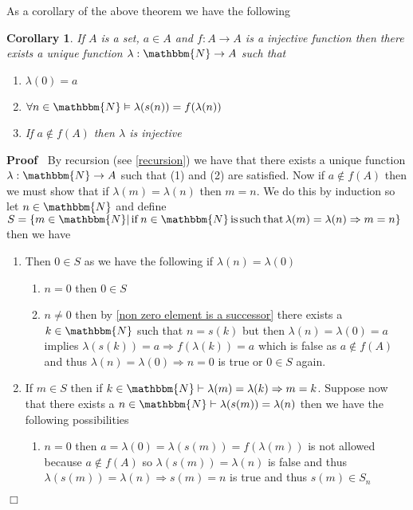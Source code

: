 \documentclass{book}
\newcommand{\nin}{\not\in}
\newcommand{\nobracket}{}
\newcommand{\tmop}[1]{\ensuremath{\operatorname{#1}}}
\newenvironment{proof}{\noindent\textbf{Proof\ }}{\hspace*{\fill}$\Box$\medskip}
\newtheorem{corollary}{Corollary}
\begin{document}
{{As a corollary of the above theorem we have the following

\begin{corollary}
  \label{recursive injective function}If $A$ is a set, $a \in A$ and $f : A
  \rightarrow A$ is a injective function then there exists a unique function
  $\lambda : \mathbbm{N} \rightarrow A$ such that
  \begin{enumerate}
    \item $\lambda (0) = a$
    
    \item $\forall n \in \mathbbm{N} \vDash \lambda (s (n)) = f (\lambda (n))$
    
    \item If $a \nin f (A)$ then $\lambda$ is injective
  \end{enumerate}
\end{corollary}

\begin{proof}
  By recursion (see \ref{recursion}) we have that there exists a unique
  function $\lambda : \mathbbm{N} \rightarrow A$ such that (1) and (2) are
  satisfied. Now if $a \nin f (A)$ then we must show that if $\lambda (m) =
  \lambda (n)$ then $m = n$. We do this by induction so let $n \in
  \mathbbm{N}$ and define $S = \{ m \in \mathbbm{N} | \tmop{if} n \in
  \mathbbm{N} \tmop{is} \tmop{such} \tmop{that} \lambda (m) = \lambda (n)
  \Rightarrow m = n \nobracket \}$ then we have
  \begin{enumerate}
    \item Then $0 \in S$ as we have the following if $\lambda (n) = \lambda
    (0)$
    \begin{enumerate}
      \item $n = 0$ then $0 \in S$
      
      \item $n \neq 0$ then by \ref{non zero element is a successor} there
      exists a $k \in \mathbbm{N}$ such that $n = s (k)$ but then $\lambda (n)
      = \lambda (0) = a$ implies $\lambda (s (k)) = a \Rightarrow f (\lambda
      (k)) = a$ which is false as $a \nin f (A)$ and thus $\lambda (n) =
      \lambda (0) \Rightarrow n = 0$ is true or $0 \in S$ again.
    \end{enumerate}
    \item If $m \in S$ then if $k \in \mathbbm{N} \vdash \lambda (m) = \lambda
    (k) \Rightarrow m = k$. Suppose now that there exists a $n \in \mathbbm{N}
    \vdash \lambda (s (m)) = \lambda (n)$ then we have the following
    possibilities
    \begin{enumerate}
      \item $n = 0$ then $a = \lambda (0) = \lambda (s (m)) = f (\lambda (m))$
      is not allowed because $a \nin f (A)$ so $\lambda (s (m)) = \lambda (n)$
      is false and thus $\lambda (s (m)) = \lambda (n) \Rightarrow s (m) = n$
      is true and thus $s (m) \in S_n$
      

\end{enumerate}
\end{enumerate}
\end{proof}}}
\end{document}
